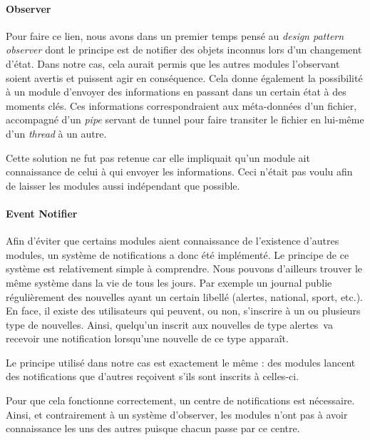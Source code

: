\documentclass[a4paper,10pt, twoside]{report}
\begin{document}
\begin{spacing}{1.2}
\paragraph{Observer}

\bigskip

Pour faire ce lien, nous avons dans un premier temps pensé au
\textit{design pattern} \textit{observer} dont le principe est de notifier des
objets inconnus lors d'un changement d'état. Dans notre cas, cela aurait permis
que les autres modules l'observant
soient avertis et puissent agir en conséquence. Cela donne
également la possibilité à un module d'envoyer des informations en
passant dans un certain état à des moments clés. Ces informations
correspondraient aux méta-données d'un fichier, accompagné d'un
\textit{pipe} servant de tunnel pour faire transiter le fichier en lui-même
d'un \textit{thread} à un autre.

Cette solution ne fut pas retenue car elle impliquait qu'un
module ait connaissance de celui à qui envoyer les informations. Ceci
n'était pas voulu afin de laisser les modules aussi indépendant que
possible.

\paragraph{Event Notifier}

\bigskip

Afin d'éviter que certains modules aient connaissance de l'existence d'autres
modules, un système de notifications a donc été implémenté. Le
principe de ce système est relativement simple à comprendre. Nous pouvons
d'ailleurs trouver le même système dans la vie de tous les jours. Par
exemple un journal publie régulièrement des nouvelles ayant un certain
libellé (\flqq alertes\frqq, \flqq national\frqq, \flqq sport\frqq, etc.).
En face, il existe des utilisateurs qui peuvent, ou non, s'inscrire à un ou
plusieurs type de nouvelles. Ainsi, quelqu'un inscrit aux nouvelles de type
\flqq alertes\frqq~va recevoir une notification lorsqu'une nouvelle de ce type
apparaît.

Le principe utilisé dans notre cas est exactement le même : des modules
lancent des notifications que d'autres reçoivent s'ils sont inscrits à
celles-ci.

Pour que cela fonctionne correctement, un centre de notifications est
nécessaire. Ainsi, et contrairement à un système d'\flqq observer\frqq,
les modules n'ont pas à avoir connaissance les uns des autres puisque chacun
passe par ce centre.


\end{spacing}
\end{document}
